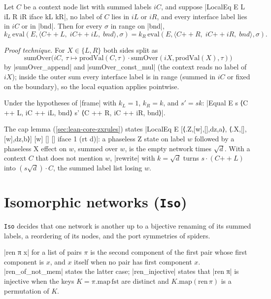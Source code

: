 \begin{theorem}\label{thm:lean-core-frame}
Let $C$ be a context node list with summed labels $iC$, and suppose
\lean|LocalEq E L iL R iR iface kL kR|, no label of $C$ lies in $iL$ or $iR$, and every interface
label lies in $iC$ or in \lean|bnd|. Then for every $\sigma$ in range on \lean|bnd|,
\[
  k_L\,\mathrm{eval}(E,\langle C\mathbin{+\!\!+}L,\;iC\mathbin{+\!\!+}iL,\;bnd\rangle,\sigma)
  =k_R\,\mathrm{eval}(E,\langle C\mathbin{+\!\!+}R,\;iC\mathbin{+\!\!+}iR,\;bnd\rangle,\sigma).
\]
\end{theorem}
\emph{Proof technique.} For $X\in\{L,R\}$ both sides split as
\[\mathrm{sumOver}\bigl(iC,\ \tau\mapsto
\mathrm{prodVal}(C,\tau)\cdot\mathrm{sumOver}(iX,\mathrm{prodVal}(X),\tau)\bigr)\]
by \lean|sumOver_append| and \lean|sumOver_const_mul| (the context reads no label of $iX$); inside the
outer sum every interface label is in range (summed in $iC$ or fixed on the boundary), so the local
equation applies pointwise.

\begin{theorem}\label{thm:lean-core-rewrite}
Under the hypotheses of \lean|frame| with $k_L=1$, $k_R=k$, and $s'=s k$:
\lean|Equal E s ⟨C ++ L, iC ++ iL, bnd⟩ s' ⟨C ++ R, iC ++ iR, bnd⟩|.
\end{theorem}

\begin{example}
The cap lemma (\cref{sec:lean-core-zxrules}) states
\lean|LocalEq E [⟨.Z,[w],[],dz,a⟩, ⟨.X,[],[w],dz,b⟩] [w] [] [] iface 1 (rt d)|: a phaseless Z
state on label $w$ followed by a phaseless X effect on $w$, summed over $w$, is the empty network
times $\sqrt d$. With a context $C$ that does not mention $w$, \lean|rewrite| with $k=\sqrt d$ turns
$s\cdot(C\mathbin{+\!\!+}L)$ into $(s\sqrt d)\cdot C$, the summed label list losing $w$.
\end{example}

\section{Isomorphic networks (\texttt{Iso})}\label{sec:lean-core-iso}

\texttt{Iso} decides that one network is another up to a bijective renaming of its summed labels,
a reordering of its nodes, and the port symmetries of spiders.

\begin{definition}[Renaming]
\lean|ren π x| for a list of pairs $\pi$ is the second component of the first pair whose first
component is $x$, and $x$ itself when no pair has first component $x$. \lean|ren_of_not_mem| states
the latter case; \lean|ren_injective| states that \lean|ren π| is injective when the keys
$K=\pi.\mathrm{map}\,\mathrm{fst}$ are distinct and $K.\mathrm{map}(\mathrm{ren}\,\pi)$ is a
permutation of $K$.
\end{definition}

